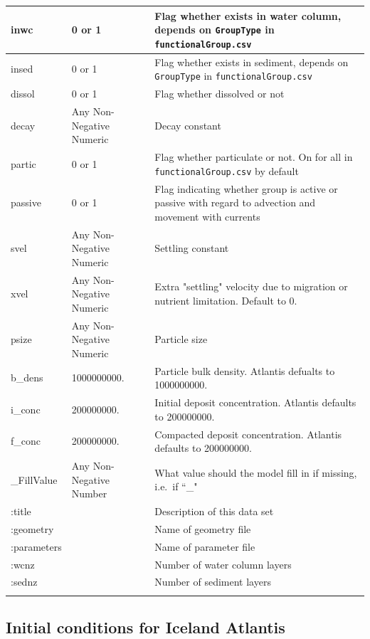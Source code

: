 \documentclass{report}
\begin{document}
\begin{center}
\begin{longtable}{llp{8cm}}
\hline
inwc & 0 or 1 & Flag whether exists in water column, depends on \texttt{GroupType} in \texttt{functionalGroup.csv} \\
\hline
insed & 0 or 1 & Flag whether exists in sediment, depends on \texttt{GroupType} in \texttt{functionalGroup.csv} \\
\hline
dissol & 0 or 1 & Flag whether dissolved or not \\
\hline
decay & Any Non-Negative Numeric & Decay constant \\
\hline 
partic & 0 or 1 & Flag whether particulate or not. On for all in \texttt{functionalGroup.csv} by default \\
\hline 
passive & 0 or 1 & Flag indicating whether group is active or passive with regard to advection and movement with currents \\
\hline
svel & Any Non-Negative Numeric & Settling constant \\ 
\hline
xvel & Any Non-Negative Numeric & Extra "settling" velocity due to migration or nutrient limitation. Default to 0. \\
\hline
psize & Any Non-Negative Numeric & Particle size \\
\hline
b\_dens & 1000000000. & Particle bulk density. Atlantis defualts to 1000000000. \\
\hline
i\_conc & 200000000. & Initial deposit concentration. Atlantis defaults to 200000000. \\
\hline
f\_conc & 200000000. & Compacted deposit concentration. Atlantis defaults to 200000000. \\
\hline
\_FillValue & Any Non-Negative Number & What value should the model fill in if missing, i.e.\ if  ``\_" \\
\hline
:title & &  Description of this data set \\
\hline
:geometry  & & Name of geometry file \\
\hline
:parameters  & & Name of parameter file \\
\hline
:wcnz & & Number of water column layers \\
\hline
:sednz & & Number of sediment layers \\
\hline
\label{tab:init}
\end{longtable}
\end{center}

\subsection{Initial conditions for Iceland Atlantis}
\end{document}
